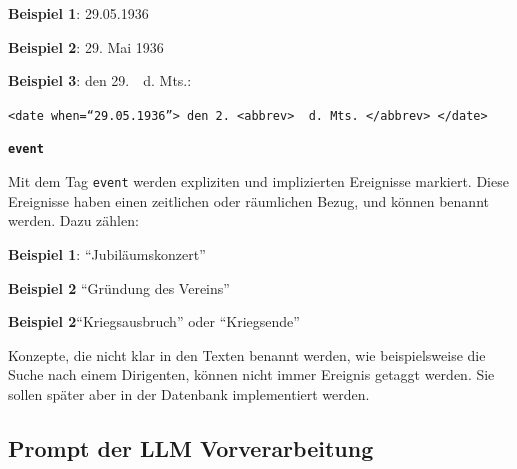 \documentclass[12pt, a4paper, ngerman, bidi=default]{article}
\newcommand{\code}[1]{\colorbox{VeryLightGray}{\texttt{#1}}} %
\begin{document}
\begin{description}
    \noindent \textbf{ Beispiel 1}:  29.05.1936

    \textbf{ Beispiel 2}: 29. Mai 1936

    \textbf{ Beispiel 3}: den 29.\ \  d. Mts.:

    \code{\string<date when=\enquote{29.05.1936}>~den 2.~<abbrev>\ \ d. Mts.~</abbrev> </date>}


    \item\texttt{\textbf{{\colorbox{eventTag}{event}}}}
    
    Mit dem Tag \texttt{\colorbox{eventTag}{event}} werden expliziten und implizierten Ereignisse markiert. Diese Ereignisse haben einen zeitlichen oder räumlichen Bezug, und können benannt werden. Dazu zählen:

    \noindent \textbf{ Beispiel 1}: \enquote{Jubiläumskonzert}

    \textbf{ Beispiel 2} \enquote{Gründung des Vereins} 

    \textbf{ Beispiel 2}\enquote{Kriegsausbruch} oder \enquote{Kriegsende}

    Konzepte, die nicht klar in den Texten benannt werden, wie beispielsweise die Suche nach einem Dirigenten, können nicht immer Ereignis getaggt werden. Sie sollen später aber in der Datenbank implementiert werden.
    \end{description}


\subsection{Prompt der LLM Vorverarbeitung}\label{subsec:LLM-Promt}
\end{document}
